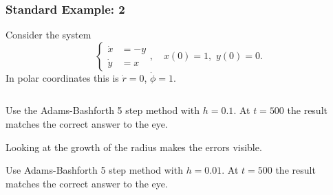 \documentclass{beamer}
\begin{document}
\begin{frame}
  \frametitle{Standard Example: 2}


  Consider the system
  \begin{equation*}
    \left\{
      \begin{aligned}
        \dot{x} & = -y \\ \dot{y} & = x
      \end{aligned} \right., \quad x(0) = 1, \, \, y(0) = 0.
  \end{equation*}
  In polar coordinates this is $\dot{r} = 0$, $\dot{\phi} = 1$.
  \begin{columns}
    \begin{column}{0.5\textwidth}
      \begin{overlayarea}{\textwidth}{0.4\textheight}
        {
          Use the Adams-Bashforth 5 step method with
          $h=0.1$. At $t=500$ the result matches the correct answer to
          the eye.
        }
        {

          \vspace{1ex}
          Looking at the growth of the radius makes the errors
          visible.
        }
        {
          Use Adams-Bashforth 5 step method with $h=0.01$. At $t=500$
          the result matches the correct answer to the eye.
        }
        {

}
\end{overlayarea}
\end{column}
\end{columns}
\end{frame}
\end{document}
